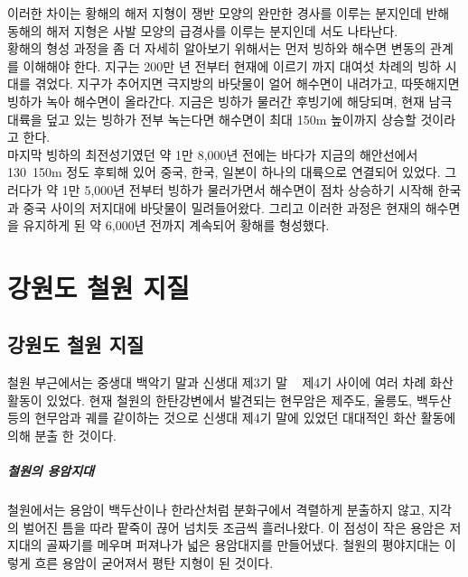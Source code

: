 \documentclass[12pt,a4paper]{book}
\newcommand{\SectionMargin}			{\newpage  \null \vskip 0cm}
\begin{document}
이러한 차이는 황해의 해저 지형이 쟁반 모양의 완만한 경사를 이루는 분지인데 반해 동해의 해저 지형은 사발 모양의 급경사를 이루는 분지인데 서도 나타난다.\\

황해의 형성 과정을 좀 더 자세히 알아보기 위해서는 먼저 빙하와 해수면 변동의 관계를 이해해야 한다. 지구는 200만 년 전부터 현재에 이르기 까지 대여섯 차례의 빙하 시대를 겪었다. 지구가 추어지면 극지방의 바닷물이 얼어 해수면이 내려가고, 따뜻해지면 빙하가 녹아 해수면이 올라간다. 지금은 빙하가 물러간 후빙기에 해당되며, 현재 남극 대륙을 덮고 있는 빙하가 전부 녹는다면 해수면이 최대 150m 높이까지 상승할 것이라고 한다.\\

마지막 빙하의 최전성기였던 약 1만 8,000년 전에는 바다가 지금의 해안선에서 130~150m 정도 후퇴해 있어 중국, 한국, 일본이 하나의 대륙으로 연결되어 있었다. 그러다가 약 1만 5,000년 전부터 빙하가 물러가면서 해수면이 점차 상승하기 시작해 한국과 중국 사이의 저지대에 바닷물이 밀려들어왔다. 그리고 이러한 과정은 현재의 해수면을 유지하게 된 약 6,000년 전까지 계속되어 황해를 형성했다.\\


\newpage
\chapter{강원도 철원 지질}



	\SectionMargin
	\section{강원도 철원 지질}
	\null



철원 부근에서는 중생대 백악기 말과 신생대 제3기 말 ~ 제4기 사이에 여러 차례 화산활동이 있었다. 현재 철원의 한탄강변에서 발견되는 현무암은 제주도, 울릉도, 백두산 등의 현무암과 궤를 같이하는 것으로 신생대 제4기 말에 있었던 대대적인 화산 활동에 의해 분출 한 것이다.\\

\paragraph{철원의 용암지대}
철원에서는 용암이 백두산이나 한라산처럼 분화구에서 격렬하게 분출하지 않고, 지각의 벌어진 틈을 따라 팥죽이 끊어 넘치듯 조금씩 흘러나왔다. 이 점성이 작은 용암은 저지대의 골짜기를 메우며 퍼져나가 넓은 용암대지를 만들어냈다. 철원의 평야지대는 이렇게 흐른 용암이 굳어져서 평탄 지형이 된 것이다.\\
\end{document}
